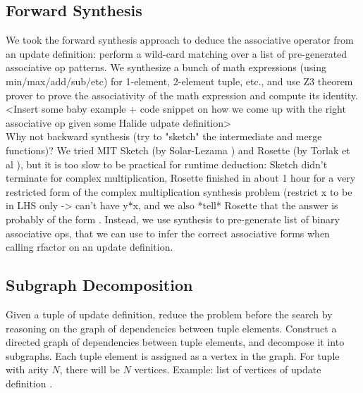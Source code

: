 \subsection{Forward Synthesis}

We took the forward synthesis approach to deduce the associative operator from an update definition: perform a wild-card matching over a list of pre-generated associative op patterns. We synthesize a bunch of math expressions (using min/max/add/sub/etc) for 1-element, 2-element tuple, etc., and use Z3 theorem prover \cite{DeMoura:2008:ZES:1792734.1792766} to prove the associativity of the math expression and compute its identity. \\

<Insert some baby example + code snippet on how we come up with the right associative op given some Halide udpate definition> \\

Why not backward synthesis (try to "sketch" the intermediate and merge functions)? We tried MIT Sketch (by Solar-Lezama \cite{Solar-Lezama:2008:PSS:1714168}) and Rosette (by Torlak et al \cite{Torlak:2013:GSL:2509578.2509586}), but it is too slow to be practical for runtime deduction: Sketch didn't terminate for complex multiplication, Rosette finished in about 1 hour for a very restricted form of the complex multiplication synthesis problem (restrict x to be in LHS only -> can't have y*x, and we also *tell* Rosette that the answer is probably of the form . Instead, we use synthesis to pre-generate list of binary associative ops, that we can use to infer the correct associative forms when calling rfactor on an update definition. \\

\subsection{Subgraph Decomposition}

Given a tuple of update definition, reduce the problem before the search by reasoning on the graph of dependencies between tuple elements. Construct a directed graph of dependencies between tuple elements, and decompose it into subgraphs. Each tuple element is assigned as a vertex in the graph. For tuple with arity $N$, there will be $N$ vertices. Example: list of vertices of update definition . \\


